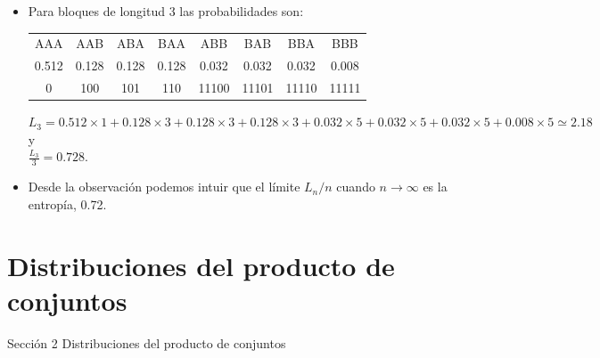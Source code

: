\documentclass{beamer}
\theoremstyle{plain}
\theoremstyle{example}
\theoremstyle{example}
\begin{document}
\begin{frame}  \small 

\begin{itemize}

\item Para bloques de longitud 3 las probabilidades son:

\begin{center}
\begin{tabular}{cccccccc}
AAA & AAB &  ABA & BAA & ABB & BAB & BBA & BBB\\
0.512 & 0.128 &  0.128 & 0.128 & 0.032 & 0.032 & 0.032 & 0.008\\
0 & 100 & 101 & 110 & 11100 & 11101 & 11110 & 11111
\end{tabular}
\end{center}

\begin{center}
$L_3=0.512 \times 1+ 0.128 \times 3 + 0.128 \times 3+ 0.128 \times 3+ 0.032 \times 5+ 0.032 \times 5+ 0.032 \times 5+ 0.008 \times 5 \simeq 2.18$ y\\ $\frac{L_3}{3}=0.728$.
\end{center}

\item Desde la observación podemos intuir que el límite $L_n/n$ cuando $n \rightarrow \infty$ es la entropía, 0.72.

\end{itemize}


\end{frame} 




\section{Distribuciones del producto de conjuntos} 
\begin{frame}   \footnotesize
{
\begin{block}{Sección 2}
Distribuciones del producto de conjuntos
\end{block}
}
\end{frame} 
\end{document}
